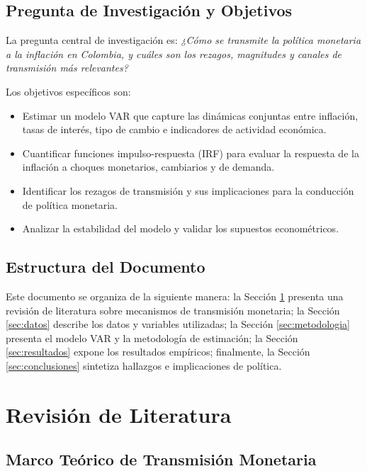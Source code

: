 \documentclass[12pt,a4paper]{article}
\begin{document}
\subsection{Pregunta de Investigación y Objetivos}

La pregunta central de investigación es: \textit{¿Cómo se transmite la política monetaria a la inflación en Colombia, y cuáles son los rezagos, magnitudes y canales de transmisión más relevantes?}

Los objetivos específicos son:

\begin{itemize}
\item Estimar un modelo VAR que capture las dinámicas conjuntas entre inflación, tasas de interés, tipo de cambio e indicadores de actividad económica.
\item Cuantificar funciones impulso-respuesta (IRF) para evaluar la respuesta de la inflación a choques monetarios, cambiarios y de demanda.
\item Identificar los rezagos de transmisión y sus implicaciones para la conducción de política monetaria.
\item Analizar la estabilidad del modelo y validar los supuestos econométricos.
\end{itemize}

\subsection{Estructura del Documento}

Este documento se organiza de la siguiente manera: la Sección \ref{sec:literatura} presenta una revisión de literatura sobre mecanismos de transmisión monetaria; la Sección \ref{sec:datos} describe los datos y variables utilizadas; la Sección \ref{sec:metodologia} presenta el modelo VAR y la metodología de estimación; la Sección \ref{sec:resultados} expone los resultados empíricos; finalmente, la Sección \ref{sec:conclusiones} sintetiza hallazgos e implicaciones de política.

\section{Revisión de Literatura}
\label{sec:literatura}

\subsection{Marco Teórico de Transmisión Monetaria}
\end{document}
